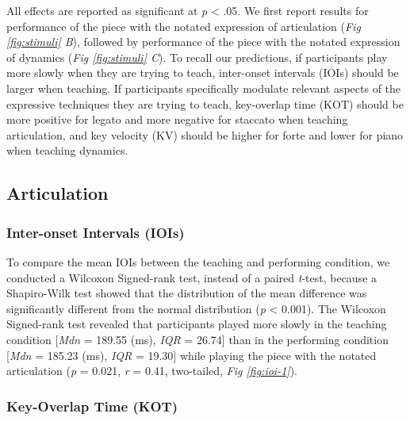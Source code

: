 \documentclass[
  man,floatsintext]{apa6}
\begin{document}
All effects are reported as significant at \emph{p} \textless{} .05. We first report results for performance of the piece with the notated expression of articulation (\emph{Fig \ref{fig:stimuli} B}), followed by performance of the piece with the notated expression of dynamics (\emph{Fig \ref{fig:stimuli} C}). To recall our predictions, if participants play more slowly when they are trying to teach, inter-onset intervals (IOIs) should be larger when teaching. If participants specifically modulate relevant aspects of the expressive techniques they are trying to teach, key-overlap time (KOT) should be more positive for legato and more negative for staccato when teaching articulation, and key velocity (KV) should be higher for forte and lower for piano when teaching dynamics.

\hypertarget{articulation}{%
\subsection{Articulation}\label{articulation}}

\hypertarget{inter-onset-intervals-iois}{%
\subsubsection{Inter-onset Intervals (IOIs)}\label{inter-onset-intervals-iois}}

To compare the mean IOIs between the teaching and performing condition, we conducted a Wilcoxon Signed-rank test, instead of a paired \emph{t}-test, because a Shapiro-Wilk test showed that the distribution of the mean difference was significantly different from the normal distribution (\emph{p} \textless{} 0.001). The Wilcoxon Signed-rank test revealed that participants played more slowly in the teaching condition {[}\emph{Mdn} = 189.55 (ms), \emph{IQR} = 26.74{]} than in the performing condition {[}\emph{Mdn} = 185.23 (ms), \emph{IQR} = 19.30{]} while playing the piece with the notated articulation (\emph{p} = 0.021, \emph{r} = 0.41, two-tailed, \emph{Fig \ref{fig:ioi-1}}).

\hypertarget{key-overlap-time-kot}{%
\subsubsection{Key-Overlap Time (KOT)}\label{key-overlap-time-kot}}
\end{document}
